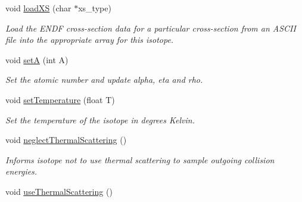 \begin{DoxyCompactItemize}
void \hyperlink{classIsotope_a19b56ea1eb66fd0192c56bbefc93bdea}{load\-X\-S} (char $\ast$xs\-\_\-type)
\begin{DoxyCompactList}\small\item\em Load the E\-N\-D\-F cross-\/section data for a particular cross-\/section from an A\-S\-C\-I\-I file into the appropriate array for this isotope. \end{DoxyCompactList}\item 
void \hyperlink{classIsotope_a0a5372bca84794e0e6f6b090b3d9d13c}{set\-A} (int A)
\begin{DoxyCompactList}\small\item\em Set the atomic number and update alpha, eta and rho. \end{DoxyCompactList}\item 
void \hyperlink{classIsotope_acfda8ecfb6f6fc93a075502b8c0e6be7}{set\-Temperature} (float T)
\begin{DoxyCompactList}\small\item\em Set the temperature of the isotope in degrees Kelvin. \end{DoxyCompactList}\item 
\hypertarget{classIsotope_a8d1e9f7fe97d0a7a7b893b69470860da}{void \hyperlink{classIsotope_a8d1e9f7fe97d0a7a7b893b69470860da}{neglect\-Thermal\-Scattering} ()}\label{classIsotope_a8d1e9f7fe97d0a7a7b893b69470860da}

\begin{DoxyCompactList}\small\item\em Informs isotope not to use thermal scattering to sample outgoing collision energies. \end{DoxyCompactList}\item 
\hypertarget{classIsotope_aeb14c3b4005dbdd8e13469f0d78a1eab}{void \hyperlink{classIsotope_aeb14c3b4005dbdd8e13469f0d78a1eab}{use\-Thermal\-Scattering} ()}\label{classIsotope_aeb14c3b4005dbdd8e13469f0d78a1eab}


\end{DoxyCompactItemize}
